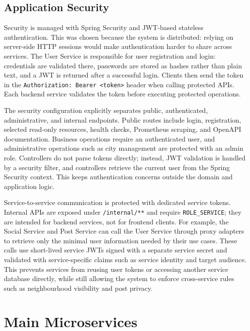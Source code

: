 \documentclass[12pt,a4paper]{article}
\begin{document}
\subsection{Application Security}

Security is managed with Spring Security and JWT-based stateless authentication. This was chosen because the system is distributed: relying on server-side HTTP sessions would make authentication harder to share across services. The User Service is responsible for user registration and login: credentials are validated there, passwords are stored as hashes rather than plain text, and a JWT is returned after a successful login. Clients then send the token in the \texttt{Authorization: Bearer <token>} header when calling protected APIs. Each backend service validates the token before executing protected operations.

The security configuration explicitly separates public, authenticated, administrative, and internal endpoints. Public routes include login, registration, selected read-only resources, health checks, Prometheus scraping, and OpenAPI documentation. Business operations require an authenticated user, and administrative operations such as city management are protected with an admin role. Controllers do not parse tokens directly; instead, JWT validation is handled by a security filter, and controllers retrieve the current user from the Spring Security context. This keeps authentication concerns outside the domain and application logic.

Service-to-service communication is protected with dedicated service tokens. Internal APIs are exposed under \texttt{/internal/**} and require \texttt{ROLE\_SERVICE}; they are intended for backend services, not for frontend clients. For example, the Social Service and Post Service can call the User Service through proxy adapters to retrieve only the minimal user information needed by their use cases. These calls use short-lived service JWTs signed with a separate service secret and validated with service-specific claims such as service identity and target audience. This prevents services from reusing user tokens or accessing another service database directly, while still allowing the system to enforce cross-service rules such as neighbourhood visibility and post privacy.

\section{Main Microservices}
\end{document}
